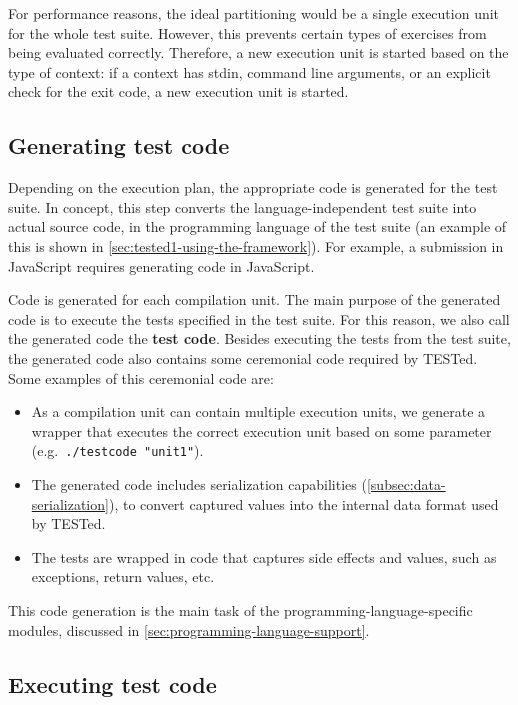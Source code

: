 \documentclass[../main]{subfiles}
\begin{document}
For performance reasons, the ideal partitioning would be a single execution unit for the whole test suite.
However, this prevents certain types of exercises from being evaluated correctly.
Therefore, a new execution unit is started based on the type of context: if a context has stdin, command line arguments, or an explicit check for the exit code, a new execution unit is started.

\subsection{Generating test code}\label{subsec:code-generation}

Depending on the execution plan, the appropriate code is generated for the test suite.
In concept, this step converts the language-independent test suite into actual source code, in the programming language of the test suite (an example of this is shown in \vref{sec:tested1-using-the-framework}).
For example, a submission in JavaScript requires generating code in JavaScript.

Code is generated for each compilation unit.
The main purpose of the generated code is to execute the tests specified in the test suite.
For this reason, we also call the generated code the \textbf{test code}.
Besides executing the tests from the test suite, the generated code also contains some ceremonial code required by TESTed.
Some examples of this ceremonial code are:

\begin{itemize}
    \item As a compilation unit can contain multiple execution units, we generate a wrapper that executes the correct execution unit based on some parameter (e.g.\ \texttt{./testcode "unit1"}).
    \item The generated code includes serialization capabilities (\vref{subsec:data-serialization}), to convert captured values into the internal data format used by TESTed.
    \item The tests are wrapped in code that captures side effects and values, such as exceptions, return values, etc.
\end{itemize}

This code generation is the main task of the programming-language-specific modules, discussed in \vref{sec:programming-language-support}.

\subsection{Executing test code}\label{subsec:executing-test-code}
\end{document}

